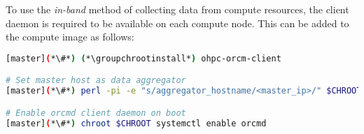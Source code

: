 To use the {\em in-band} method of collecting data from compute resources, the
\ORCM{} client daemon is required to be available on each compute node. This can
be added to the compute image as follows:

\begin{lstlisting}[language=bash,keywords={},upquote=true]
[master](*\#*) (*\groupchrootinstall*) ohpc-orcm-client

# Set master host as data aggregator
[master](*\#*) perl -pi -e "s/aggregator_hostname/<master_ip>/" $CHROOT/opt/open-rcm/etc/orcm-site.xml

# Enable orcmd client daemon on boot
[master](*\#*) chroot $CHROOT systemctl enable orcmd
\end{lstlisting}

